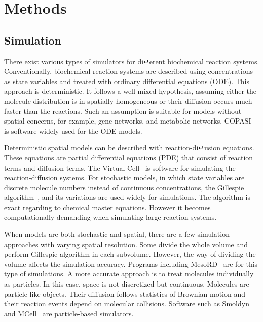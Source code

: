 \chapter{Methods}
\section{Simulation}
There exist various types of simulators for di↵erent biochemical reaction systems. Conventionally, biochemical reaction systems are described using concentrations as state variables and treated with ordinary differential equations (ODE). This approach is deterministic. It follows a well-mixed hypothesis, assuming either the molecule distribution is in spatially homogeneous or their diffusion occurs much faster than the reactions. Such an assumption is suitable for models without spatial concerns, for example, gene networks, and metabolic networks. COPASI~\cite{} is software widely used for the ODE models.

Deterministic spatial models can be described with reaction-di↵usion equations. These equations are partial differential equations (PDE) that consist of reaction terms and diffusion terms. The Virtual Cell~\cite{} is software for simulating the reaction-diffusion systems. For stochastic models, in which state variables are discrete molecule numbers instead of continuous concentrations, the Gillespie algorithm~\cite{}, and its variations are used widely for simulations. The algorithm is exact regarding to chemical master equations. However it becomes computationally demanding when simulating large reaction systems.

When models are both stochastic and spatial, there are a few simulation approaches with varying spatial resolution. Some divide the whole volume and perform Gillespie algorithm in each subvolume. However, the way of dividing the volume affects the simulation accuracy. Programs including MesoRD~\cite{} are for this type of simulations. A more accurate approach is to treat molecules individually as particles. In this case, space is not discretized but continuous. Molecules are particle-like objects. Their diffusion follows statistics of Brownian motion and their reaction events depend on molecular collisions. Software such as Smoldyn~\cite{} and MCell~\cite{} are particle-based simulators.

